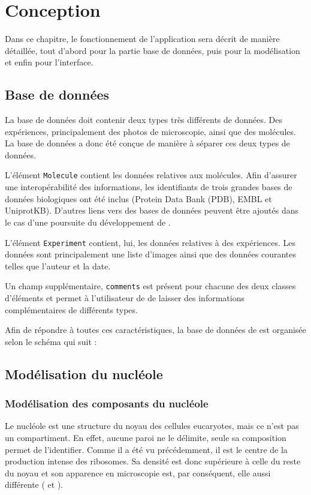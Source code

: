 \chapter{Conception}

Dans ce chapitre, le fonctionnement de l'application sera décrit de
manière détaillée, tout d'abord pour la partie base de données, puis
pour la modélisation et enfin pour l'interface.

\section{Base de données}

La base de données doit contenir deux types très différents de
données. Des expériences, principalement des photos de microscopie,
ainsi que des molécules. La base de données a donc été conçue de manière
à séparer ces deux types de données.

L'élément \texttt{Molecule} contient les données relatives aux
molécules. Afin d'assurer une interopérabilité des informations, les
identifiants de trois grandes bases de données biologiques ont été
inclus (Protein Data Bank (PDB), EMBL et UniprotKB). D'autres liens vers des bases de données peuvent être ajoutés dans le cas d'une poursuite du
développement de \NQ.

L'élément \texttt{Experiment} contient, lui, les données relatives à des
expériences. Les données sont principalement une liste d'images ainsi
que des données courantes telles que l'auteur et la date. 

Un champ supplémentaire, \texttt{comments} est présent pour chacune des deux classes d'éléments et permet à l'utilisateur de \NQ de laisser des informations complémentaires de différents types.

Afin de répondre à toutes ces caractéristiques, la base de données de
\NQ est organisée selon le schéma qui suit :


\section{Modélisation du nucléole}

\subsection{Modélisation des composants du nucléole}

Le nucléole est une structure du noyau des cellules eucaryotes, mais
ce n'est pas un compartiment. En effet, aucune paroi ne le délimite,
seule sa composition permet de l'identifier. Comme il a été vu
précédemment, il est le centre de la production intense des
ribosomes. Sa densité est donc supérieure à celle du reste du noyau et
son apparence en microscopie est, par conséquent, elle aussi
différente (\cite{Raska2006} et \cite{Thiry2005}).


